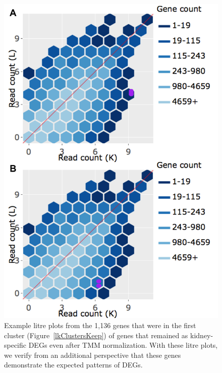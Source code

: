\documentclass[11pt,a4paper,oldfontcommands,openany]{memoir}
\numberwithin{equation}{section} %
\begin{document}
\null
\begin{figure}[t!]
\begin{framed}
\centerline{\includegraphics[width=0.7\columnwidth]{MakeFigures/Dashboards/litreClusterKeep/litreClusterKeep.jpg}}
\end{framed}
\caption{Example litre plots from the 1,136 genes that were in the first cluster (Figure~\ref{lkClustersKeep}) of genes that remained as kidney-specific DEGs even after TMM normalization. With these litre plots, we verify from an additional perspective that these genes demonstrate the expected patterns of DEGs.
\label{litreClusterKeep}}
\end{figure}
\end{document}
